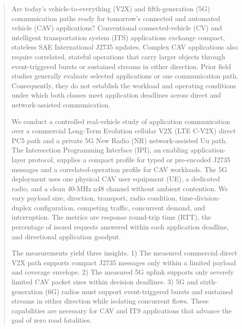 \begin{abstract}
Are today's vehicle-to-everything (V2X) and fifth-generation (5G) communication
paths ready for tomorrow's connected and automated vehicle (CAV) applications?
Conventional connected-vehicle (CV) and intelligent transportation system (ITS)
applications exchange compact, stateless SAE International J2735 updates.
Complex CAV applications also require correlated, stateful operations that
carry larger objects through event-triggered bursts or sustained streams in
either direction. Prior field studies generally evaluate selected applications
or one communication path. Consequently, they do not establish the workload and
operating conditions under which both classes meet application deadlines across
direct and network-assisted communication.

We conduct a controlled real-vehicle study of application communication over a
commercial Long-Term Evolution cellular V2X (LTE C-V2X) direct PC5 path and a
private 5G New Radio (NR) network-assisted Uu path. The Intersection Programming
Interface (IPI), an enabling application-layer protocol, supplies a compact
profile for typed or pre-encoded J2735 messages and a correlated-operation
profile for CAV workloads. The 5G deployment uses one physical CAV user
equipment (UE), a dedicated radio, and a clean 40-MHz n48 channel without
ambient contention. We vary payload size, direction, transport, radio
condition, time-division-duplex configuration, competing traffic, concurrent
demand, and interruption. The metrics are response round-trip time (RTT), the
percentage of issued requests answered within each application deadline, and
directional application goodput.

The measurements yield three insights. 1) The measured commercial direct V2X
path supports compact J2735 messages only within a limited payload and coverage
envelope. 2) The measured 5G uplink supports only severely limited CAV packet
sizes within decision deadlines. 3) 5G and
sixth-generation (6G) radios must support event-triggered bursts and sustained
streams in either direction while isolating concurrent flows. These capabilities
are necessary for CAV and ITS applications that advance the goal of zero road
fatalities.
\end{abstract}
